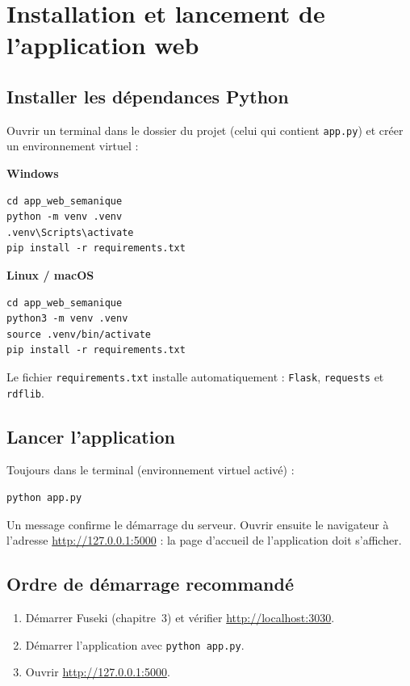 ﻿\documentclass[12pt,a4paper]{report}
\begin{document}
\chapter{Installation et lancement de l'application web}

\section{Installer les dépendances Python}

Ouvrir un terminal dans le dossier du projet (celui qui contient \texttt{app.py}) et créer un
environnement virtuel :

\textbf{Windows}

\begin{lstlisting}
cd app_web_semanique
python -m venv .venv
.venv\Scripts\activate
pip install -r requirements.txt
\end{lstlisting}

\textbf{Linux / macOS}

\begin{lstlisting}
cd app_web_semanique
python3 -m venv .venv
source .venv/bin/activate
pip install -r requirements.txt
\end{lstlisting}

\noindent Le fichier \texttt{requirements.txt} installe automatiquement :
\texttt{Flask}, \texttt{requests} et \texttt{rdflib}.

\section{Lancer l'application}

Toujours dans le terminal (environnement virtuel activé) :

\begin{lstlisting}
python app.py
\end{lstlisting}

\noindent Un message confirme le démarrage du serveur. Ouvrir ensuite le navigateur à l'adresse
\url{http://127.0.0.1:5000} : la page d'accueil de l'application doit s'afficher.

\section{Ordre de démarrage recommandé}

\begin{enumerate}
\item Démarrer Fuseki (chapitre~3) et vérifier \url{http://localhost:3030}.
\item Démarrer l'application avec \texttt{python app.py}.
\item Ouvrir \url{http://127.0.0.1:5000}.
\end{enumerate}
\end{document}
